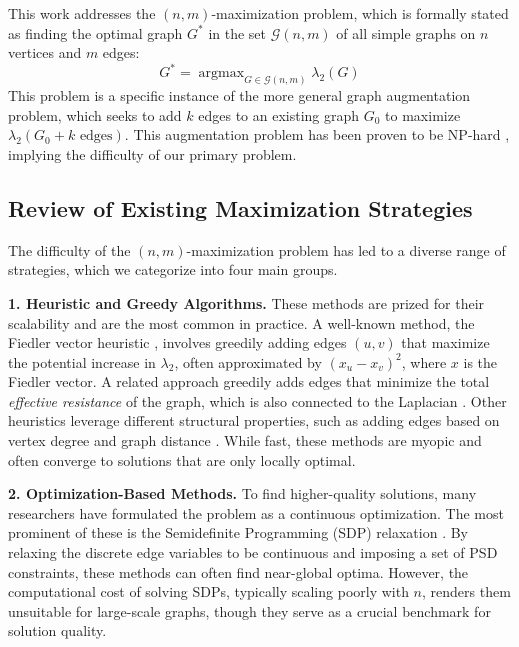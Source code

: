 \documentclass{article}
\DeclareMathOperator*{\argmax}{argmax}
\begin{document}
This work addresses the $(n, m)$-maximization problem, which is formally stated as finding the optimal graph $G^*$ in the set $\mathcal{G}(n, m)$ of all simple graphs on $n$ vertices and $m$ edges:
\begin{equation}
    G^* = \argmax_{G \in \mathcal{G}(n, m)} \lambda_2(G)
\end{equation}
This problem is a specific instance of the more general graph augmentation problem, which seeks to add $k$ edges to an existing graph $G_0$ to maximize $\lambda_2(G_0 + k \text{ edges})$. This augmentation problem has been proven to be NP-hard \cite{MOSKAOYAMA2008677}, implying the difficulty of our primary problem.

\subsection{Review of Existing Maximization Strategies}

The difficulty of the $(n, m)$-maximization problem has led to a diverse range of strategies, which we categorize into four main groups.

\textbf{1. Heuristic and Greedy Algorithms.} These methods are prized for their scalability and are the most common in practice. A well-known method, the Fiedler vector heuristic \cite{ghosh2006growing}, involves greedily adding edges $(u, v)$ that maximize the potential increase in $\lambda_2$, often approximated by $(x_u - x_v)^2$, where $x$ is the Fiedler vector. A related approach greedily adds edges that minimize the total \textit{effective resistance} of the graph, which is also connected to the Laplacian \cite{doi:10.1137/050645452}. Other heuristics leverage different structural properties, such as adding edges based on vertex degree and graph distance \cite{8412478}. While fast, these methods are myopic and often converge to solutions that are only locally optimal.

\textbf{2. Optimization-Based Methods.} To find higher-quality solutions, many researchers have formulated the problem as a continuous optimization. The most prominent of these is the Semidefinite Programming (SDP) relaxation \cite{ghosh2006growing, de2013semidefinite}. By relaxing the discrete edge variables to be continuous and imposing a set of PSD constraints, these methods can often find near-global optima. However, the computational cost of solving SDPs, typically scaling poorly with $n$, renders them unsuitable for large-scale graphs, though they serve as a crucial benchmark for solution quality.
\end{document}
